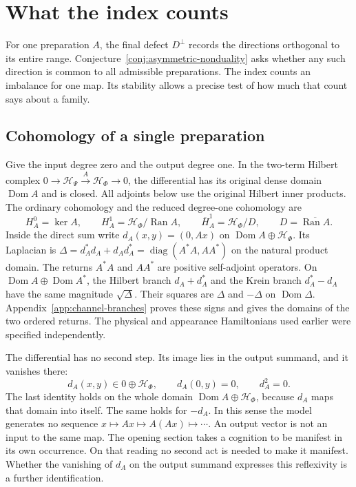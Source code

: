 \documentclass[11pt]{article}
\theoremstyle{definition}
\DeclareMathOperator{\Ran}{Ran}
\begin{document}
\section{What the index counts}
\label{sec:cohomology-index}

For one preparation $A$, the final defect $D^\perp$ records the directions orthogonal to its entire range. Conjecture~\ref{conj:asymmetric-nonduality} asks whether any such direction is common to all admissible preparations. The index counts an imbalance for one map. Its stability allows a precise test of how much that count says about a family.

\subsection{Cohomology of a single preparation}

Give the input degree zero and the output degree one. In the two-term Hilbert complex $0\to\mathcal H_\Psi\xrightarrow{A}\mathcal H_\Phi\to0$, the differential has its original dense domain $\operatorname{Dom}A$ and is closed. All adjoints below use the original Hilbert inner products. The ordinary cohomology and the reduced degree-one cohomology are \cite{BruningLesch}
\begin{equation}
 H^0_A=\ker A,\qquad H^1_A=\mathcal H_\Phi/\Ran A,\qquad
 \overline H^1_A=\mathcal H_\Phi/D,\qquad D=\overline{\Ran A}.
 \label{eq:index-cohomology}
\end{equation}
Inside the direct sum write $d_A(x,y)=(0,Ax)$ on $\operatorname{Dom}A\oplus\mathcal H_\Phi$. Its Laplacian is $\Delta=d_A^*d_A+d_Ad_A^*=\operatorname{diag}(A^*A,AA^*)$ on the natural product domain. The returns $A^*A$ and $AA^*$ are positive self-adjoint operators. On $\operatorname{Dom}A\oplus\operatorname{Dom}A^*$, the Hilbert branch $d_A+d_A^*$ and the Krein branch $d_A^*-d_A$ have the same magnitude $\sqrt\Delta$. Their squares are $\Delta$ and $-\Delta$ on $\operatorname{Dom}\Delta$. Appendix~\ref{app:channel-branches} proves these signs and gives the domains of the two ordered returns. The physical and appearance Hamiltonians used earlier were specified independently.

The differential has no second step. Its image lies in the output summand, and it vanishes there:
\begin{equation}
 d_A(x,y)\in0\oplus\mathcal H_\Phi,\qquad d_A(0,y)=0,\qquad d_A^2=0 .
 \label{eq:index-no-second-step}
\end{equation}
The last identity holds on the whole domain $\operatorname{Dom}A\oplus\mathcal H_\Phi$, because $d_A$ maps that domain into itself. The same holds for $-d_A$. In this sense the model generates no sequence $x\mapsto Ax\mapsto A(Ax)\mapsto\cdots$. An output vector is not an input to the same map. The opening section takes a cognition to be manifest in its own occurrence. On that reading no second act is needed to make it manifest. Whether the vanishing of $d_A$ on the output summand expresses this reflexivity is a further identification.
\end{document}
